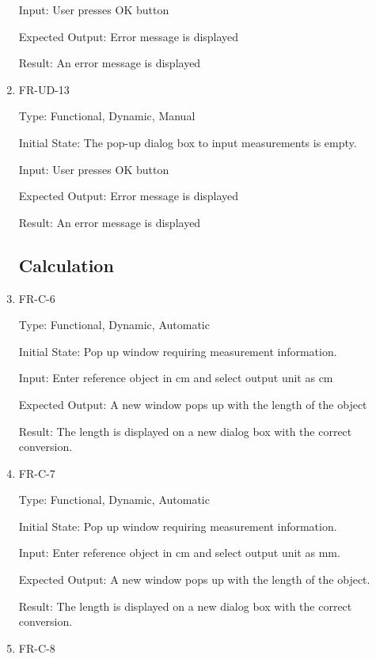 \documentclass[12pt, titlepage]{article}
\begin{document}
\begin{enumerate}
					Input: User presses OK button
					
					Expected Output: Error message is displayed
					
					Result: An error message is displayed

\item{FR-UD-13\\}
					
					Type: Functional, Dynamic, Manual
					
					Initial State: The pop-up dialog box to input measurements is empty.
					
					Input: User presses OK button
					
					Expected Output: Error message is displayed
					
					Result: An error message is displayed

\subsection{Calculation}


					
					\item{FR-C-6\\}
					
					Type: Functional, Dynamic, Automatic
					
					Initial State: Pop up window requiring measurement information.
					
					Input: Enter reference object in cm and select output unit as cm
					
					Expected Output: A new window pops up with the length of the object
					
					Result: The length is displayed on a new dialog box with the correct conversion.
					\item{FR-C-7\\}
					
					Type: Functional, Dynamic, Automatic
					
					Initial State: Pop up window requiring measurement information.
					
					Input: Enter reference object in cm and select output unit as mm.
					
					Expected Output: A new window pops up with the length of the object.
					
					Result: The length is displayed on a new dialog box with the correct conversion.
				
				    \item{FR-C-8\\}
					

\end{enumerate}
\end{document}
